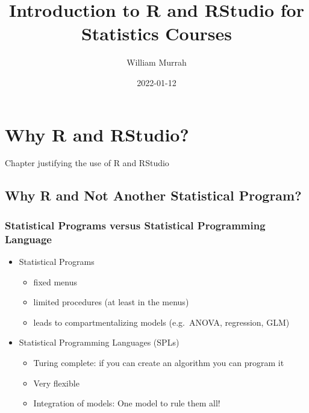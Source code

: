 \documentclass[
]{book}
\title{Introduction to R and RStudio for Statistics Courses}
\author{William Murrah}
\date{2022-01-12}
\providecommand{\tightlist}{%
  \setlength{\itemsep}{0pt}\setlength{\parskip}{0pt}}
\begin{document}
\maketitle

{
\setcounter{tocdepth}{1}
\tableofcontents
}
\hypertarget{intro}{%
\chapter{Why R and RStudio?}\label{intro}}

Chapter justifying the use of R and RStudio

\hypertarget{why-r-and-not-another-statistical-program}{%
\section{Why R and Not Another Statistical Program?}\label{why-r-and-not-another-statistical-program}}

\hypertarget{statistical-programs-versus-statistical-programming-language}{%
\subsection{Statistical Programs versus Statistical Programming Language}\label{statistical-programs-versus-statistical-programming-language}}

\begin{itemize}
\tightlist
\item
  Statistical Programs

  \begin{itemize}
  \tightlist
  \item
    fixed menus
  \item
    limited procedures (at least in the menus)
  \item
    leads to compartmentalizing models (e.g.~ANOVA, regression, GLM)
  \end{itemize}
\item
  Statistical Programming Languages (SPLs)

  \begin{itemize}
  \tightlist
  \item
    Turing complete: if you can create an algorithm you can program it
  \item
    Very flexible
  \item
    Integration of models: One model to rule them all!
  \end{itemize}
\end{itemize}
\end{document}
